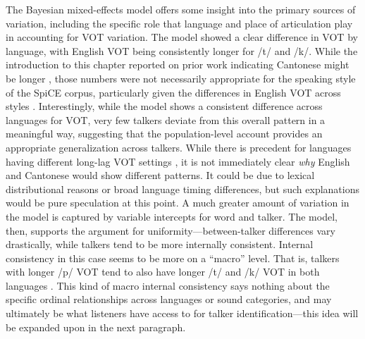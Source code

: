 The Bayesian mixed-effects model offers some insight into the primary sources of variation, including the specific role that language and place of articulation play in accounting for VOT variation. The model showed a clear difference in VOT by language, with English VOT being consistently longer for /t/ and /k/. While the introduction to this chapter reported on prior work indicating Cantonese might be longer \citep{clumeck_1981_cantonese, lisker_1964_vot}, those numbers were not necessarily appropriate for the speaking style of the SpiCE corpus, particularly given the differences in English VOT across styles \citep{stuartsmith_2015_private}. Interestingly, while the model shows a consistent difference across languages for VOT, very few talkers deviate from this overall pattern in a meaningful way, suggesting that the population-level account provides an appropriate generalization across talkers. While there is precedent for languages having different long-lag VOT settings \citep{chodroff_2019_covariation}, it is not immediately clear \textit{why} English and Cantonese would show different patterns. It could be due to lexical distributional reasons or  broad language timing differences, but such explanations would be pure speculation at this point. A much greater amount of variation in the model is captured by variable intercepts for word and talker. The model, then, supports the argument for uniformity---between-talker differences vary drastically, while talkers tend to be more internally consistent. Internal consistency in this case seems to be more on a ``macro'' level. That is, talkers with longer /p/ VOT tend to also have longer /t/ and /k/ VOT in both languages \citep[as with speech rate in][]{bradlow_2017_rate}. This kind of macro internal consistency says nothing about the specific ordinal relationships across languages or sound categories, and may ultimately be what listeners have access to for talker identification---this idea will be expanded upon in the next paragraph. 

